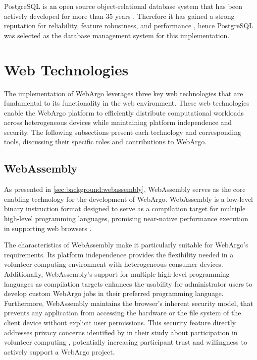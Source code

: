 PostgreSQL is an open source object-relational database system that has been actively developed for more than 35 years \cite{methodology:db}. Therefore it has gained a strong reputation for reliability, feature robustness, and performance \cite{methodology:db}, hence PostgreSQL was selected as the database management system for this implementation.

\section{Web Technologies}
\label{sec:methodology:technologies}
The implementation of WebArgo leverages three key web technologies that are fundamental to its functionality in the web environment. These web technologies enable the WebArgo platform to efficiently distribute computational workloads across heterogeneous devices while maintaining platform independence and security. The following subsections present each technology and corresponding tools, discussing their specific roles and contributions to WebArgo.

\subsection{WebAssembly}
\label{sec:methodology:wasm}
As presented in \autoref{sec:background:webassembly}, WebAssembly serves as the core enabling technology for the development of WebArgo. WebAssembly is a low-level binary instruction format designed to serve as a compilation target for multiple high-level programming languages, promising near-native performance execution in supporting web browsers \cite{methodology:wasm, methodology:wasmW3C, methodology:wasm2}.

The characteristics of WebAssembly make it particularly suitable for WebArgo's requirements. Its platform independence provides the flexibility needed in a volunteer computing environment with heterogeneous consumer devices. Additionally, WebAssembly's support for multiple high-level programming languages as compilation targets enhances the usability for administrator users to develop custom WebArgo jobs in their preferred programming language. Furthermore, WebAssembly maintains the browser's inherent security model, that prevents any application from accessing the hardware or the file system of the client device without explicit user permissions. This security feature directly addresses privacy concerns identified by \citeauthor{intro:volunteerStudy} in their study about participation in volunteer computing \cite{intro:volunteerStudy}, potentially increasing participant trust and willingness to actively support a WebArgo project.

